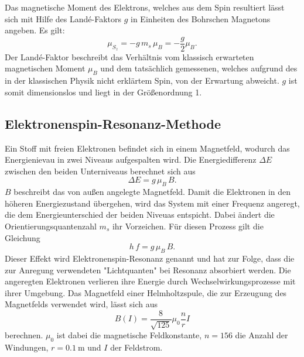 Das magnetische Moment des Elektrons, welches aus dem Spin resultiert lässt sich mit Hilfe des Landé-Faktors $g$ in Einheiten des Bohrschen Magnetons angeben. Es gilt:
\begin{equation}
  \mu_{S_z} = -g\,m_s\,\mu_B = -\frac{g}{2}\mu_B.
\end{equation}
Der Landé-Faktor beschreibt das Verhältnis vom klassisch erwarteten magnetischen Moment $\mu_B$ und dem tatsächlich gemessenen, welches aufgrund des in der klassischen Physik nicht erklärtem Spin, von der Erwartung abweicht. $g$ ist somit dimensionslos und liegt in der Größenordnung 1.

\subsection{Elektronenspin-Resonanz-Methode}
Ein Stoff mit freien Elektronen befindet sich in einem Magnetfeld, wodurch das Energienievau in zwei Niveaus aufgespalten wird. Die Energiedifferenz $\Delta E$ zwischen den beiden Unterniveaus berechnet sich aus
\begin{equation}
  \Delta E = g\,\mu_B\,B.
\end{equation}
$B$ beschreibt das von außen angelegte Magnetfeld.
Damit die Elektronen in den höheren Energiezustand übergehen, wird das System mit einer Frequenz angeregt, die dem Energieunterschied der beiden Niveuas entspicht. Dabei ändert die Orientierungsquantenzahl $m_s$ ihr Vorzeichen. Für diesen Prozess gilt die Gleichung
\begin{equation}
\label{eqn:g}
  h\,f=g\,\mu_B\,B.
\end{equation}
Dieser Effekt wird Elektronenspin-Resonanz genannt und hat zur Folge, dass die zur Anregung verwendeten "Lichtquanten" bei Resonanz absorbiert werden. Die angeregten Elektronen verlieren ihre Energie durch Wechselwirkungsprozesse mit ihrer Umgebung.
Das Magnetfeld einer Helmholtzspule, die zur Erzeugung des Magnetfelds verwendet wird, lässt sich aus
\begin{equation}
\label{eqn:spule}
  B(I)=\frac{8}{\sqrt{125}}\mu_0\frac{n}{r}I
\end{equation}
berechnen. $\mu_0$ ist dabei die magnetische Feldkonstante, $n=156$ die Anzahl der Windungen, $r=\SI{0,1}{\meter}$ und $I$ der Feldstrom.
